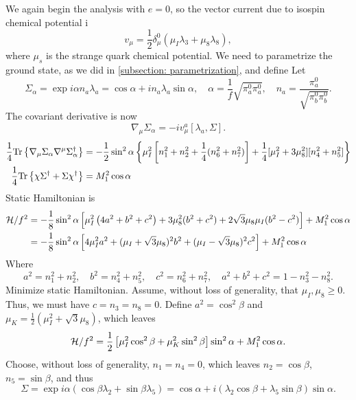 %
We again begin the analysis with $e = 0$, so the vector current due to isospin chemical potential i
%
\begin{equation}
    v_\mu = \frac{1}{2} \delta^0_\mu ( \mu_I  \lambda_3 + \mu_8 \lambda_8),
\end{equation}
%
where $\mu_s$ is the strange quark chemical potential.
We need to parametrize the ground state, as we did in \autoref{subsection: parametrization}, and define
Let
%
\begin{equation}
    \Sigma_\alpha 
    = \exp{i \alpha n_a \lambda_a} = \cos \alpha + i n_a \lambda_a \sin \alpha,
    \quad \alpha = \frac{1}{f} \sqrt{\pi_a^0 \pi_a^0}, \quad n_a = \frac{\pi_a^0}{\sqrt{\pi_b^0 \pi_b^0}}.
\end{equation}
%
The covariant derivative is now
%
\begin{equation}
    \nabla_\mu \Sigma_\alpha = -i v_\mu^a [\lambda_a, \Sigma].
\end{equation}
%
\begin{align}
    \frac{1}{4} \text{Tr} \left\{ \nabla_\mu \Sigma_\alpha \nabla^\mu \Sigma_\alpha^\dagger \right\}
    & = -\frac{1}{2} \sin^2 \alpha
    \left\{
        \mu_I^2 \left[n_1^2 + n_2^2 + \frac{1}{4}(n_6^2 + n_7^2)\right]
        + \frac{1}{4} [\mu_I^2 + 3 \mu_8^2][n_4^2 + n_5^2] 
    \right\} \\
    \frac{1}{4} \text{Tr} \left\{ \chi \Sigma^\dagger + \Sigma \chi^\dagger \right\} 
    & = M_1^2 \cos \alpha
\end{align}
%
Static Hamiltonian is
%
\begin{align}
    \mathcal{H} / f^2
    &= -\frac{1}{8} \sin^2 \alpha 
    \left[
        \mu_I^2 \left(4a^2 + b^2 + c^2\right) 
        + 3 \mu_8^2 (b^2 + c^2)
        + 2 \sqrt{3} \mu_8 \mu_I (b^2 - c^2)
    \right]
    + M_1^2 \cos\alpha\\
    &= -\frac{1}{8} \sin^2\alpha
    \left[
        4 \mu_I^2 a^2  + (\mu_I + \sqrt 3 \mu_8 )^2b^2 + (\mu_I - \sqrt 3 \mu_8)^2c^2  
    \right]
    + M_1^2 \cos\alpha
\end{align}
%
Where
%
\begin{equation}
    a^2 = n_1^2 + n_2^2, \quad
    b^2 = n_4^2 + n_5^2, \quad
    c^2 = n_6^2 + n_7^2, \quad
    a^2 + b^2 + c^2 = 1 - n_3^2 - n_8^2.
\end{equation}
%
Minimize static Hamiltonian.
Assume, without loss of generality, that $\mu_I, \mu_8 \geq 0$.
Thus, we must have $c = n_3 = n_8 = 0$.
Define $a^2 = \cos^2\beta$ and $\mu_K = \frac{1}{2}(\mu_I^2 + \sqrt 3 \mu_8)$, which leaves
%
\begin{equation}
    \mathcal{H} / f^2 =
    \frac{1}{2} 
    \left[
        \mu_I^2 \cos^2\beta + \mu_K^2\sin^2\beta
    \right]
    \sin^2\alpha
    +
    M_1^2 \cos\alpha.
\end{equation}
%
Choose, without loss of generality, $n_1 = n_4 = 0$, which leaves $n_2 = \cos\beta$, $n_5 = \sin\beta$, and thus
%
\begin{equation}
    \Sigma = \exp{i \alpha (\cos\beta \lambda_2 + \sin\beta \lambda_5) }
    = \cos\alpha + i (\lambda_2 \cos\beta + \lambda_5 \sin\beta)\sin\alpha.
\end{equation}

